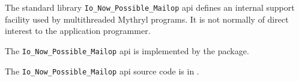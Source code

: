 
The standard library {\tt Io\_Now\_Possible\_Mailop} api defines an internal support facility used by multithreaded Mythryl programs.
It is not normally of direct interest to the application programmer.

The {\tt Io\_Now\_Possible\_Mailop} api is implemented by the  package.

The {\tt Io\_Now\_Possible\_Mailop} api source code is in .
